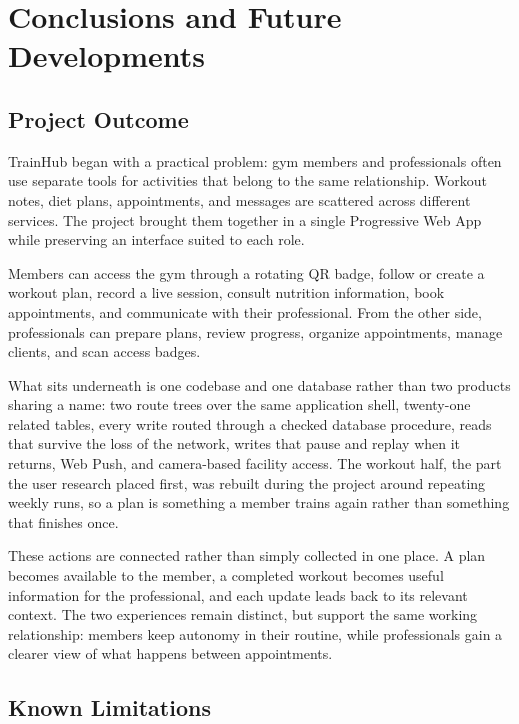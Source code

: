 \section{Conclusions and Future Developments}\label{sect:ConclusionFutureDevelopments}

\subsection{Project Outcome}\label{subsect:ProjectOutcome}

TrainHub began with a practical problem: gym members and professionals often use separate tools for activities that belong to the same relationship. Workout notes, diet plans, appointments, and messages are scattered across different services. The project brought them together in a single Progressive Web App while preserving an interface suited to each role.

Members can access the gym through a rotating QR badge, follow or create a workout plan, record a live session, consult nutrition information, book appointments, and communicate with their professional. From the other side, professionals can prepare plans, review progress, organize appointments, manage clients, and scan access badges.

What sits underneath is one codebase and one database rather than two products sharing a name: two route trees over the same application shell, twenty-one related tables, every write routed through a checked database procedure, reads that survive the loss of the network, writes that pause and replay when it returns, Web Push, and camera-based facility access. The workout half, the part the user research placed first, was rebuilt during the project around repeating weekly runs, so a plan is something a member trains again rather than something that finishes once.

These actions are connected rather than simply collected in one place. A plan becomes available to the member, a completed workout becomes useful information for the professional, and each update leads back to its relevant context. The two experiences remain distinct, but support the same working relationship: members keep autonomy in their routine, while professionals gain a clearer view of what happens between appointments.

\subsection{Known Limitations}\label{subsect:KnownLimitations}

